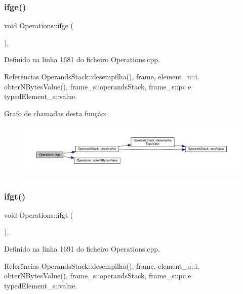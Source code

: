 \subsubsection{\texorpdfstring{ifge()}{ifge()}}
{\footnotesize\ttfamily void Operations\+::ifge (\begin{DoxyParamCaption}{ }\end{DoxyParamCaption})\hspace{0.3cm}{\ttfamily [static]}, {\ttfamily [private]}}



Definido na linha 1681 do ficheiro Operations.\+cpp.



Referências Operands\+Stack\+::desempilha(), frame, element\+\_\+u\+::i, obter\+N\+Bytes\+Value(), frame\+\_\+s\+::operands\+Stack, frame\+\_\+s\+::pc e typed\+Element\+\_\+s\+::value.

Grafo de chamadas desta função\+:
\nopagebreak
\begin{figure}[H]
\begin{center}
\leavevmode
\includegraphics[width=350pt]{classOperations_a0e7cf2111ad25ee52aa329cc6ec4d38a_cgraph}
\end{center}
\end{figure}
\mbox{\label{classOperations_afff52b972f58750ea8037aeb02dd22bc}} 
\subsubsection{\texorpdfstring{ifgt()}{ifgt()}}
{\footnotesize\ttfamily void Operations\+::ifgt (\begin{DoxyParamCaption}{ }\end{DoxyParamCaption})\hspace{0.3cm}{\ttfamily [static]}, {\ttfamily [private]}}



Definido na linha 1691 do ficheiro Operations.\+cpp.



Referências Operands\+Stack\+::desempilha(), frame, element\+\_\+u\+::i, obter\+N\+Bytes\+Value(), frame\+\_\+s\+::operands\+Stack, frame\+\_\+s\+::pc e typed\+Element\+\_\+s\+::value.

